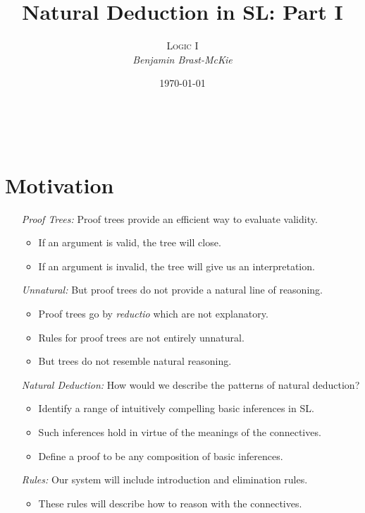 \documentclass[a4paper, 11pt]{article} %
\title{\textbf{Natural Deduction in SL: Part I}} %
\author{\textsc{Logic I}\\ \em Benjamin Brast-McKie} %
\date{\today} %
\makeatletter
\renewcommand{\maketitle}{ %
\begin{flushright} %
{\LARGE\@title} %

\vspace{10pt} %

{\@author} %
\\\@date %

\vspace{-10pt} %
\end{flushright}
}
\makeatother
\begin{document}
\maketitle %

\thispagestyle{empty}


\section*{Motivation}

\begin{enumerate}
  \item[\it Proof Trees:] Proof trees provide an efficient way to evaluate validity.
    \begin{itemize}
      \item If an argument is valid, the tree will close.
      \item If an argument is invalid, the tree will give us an interpretation.
    \end{itemize}
  \item[\it Unnatural:] But proof trees do not provide a natural line of reasoning.
    \begin{itemize}
      \item Proof trees go by \textit{reductio} which are not explanatory.
      \item Rules for proof trees are not entirely unnatural.
      \item But trees do not resemble natural reasoning.
    \end{itemize}
  \item[\it Natural Deduction:] How would we describe the patterns of natural deduction?
    \begin{itemize}
      \item Identify a range of intuitively compelling basic inferences in SL.
      \item Such inferences hold in virtue of the meanings of the connectives.
      \item Define a proof to be any composition of basic inferences.
    \end{itemize}
  \item[\it Rules:] Our system will include introduction and elimination rules.
    \begin{itemize}
      \item These rules will describe how to reason with the connectives.
    \end{itemize}
\end{enumerate}
\end{document}
